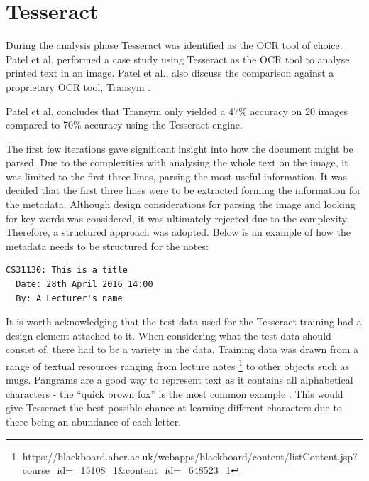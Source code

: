 \section{Tesseract} \label{design:tesseract}
During the analysis phase Tesseract was identified as the OCR tool of choice. Patel et al. \cite{citeulike:13920892} performed a case study using Tesseract as the OCR tool to analyse printed text in an image. Patel et al., also discuss the comparison against a proprietary OCR tool, Transym \cite{citeulike:14023819}.

Patel et al. concludes that Transym only yielded a 47\% accuracy on 20 images compared to 70\% accuracy using the Tesseract engine.

The first few iterations gave significant insight into how the document might be parsed. Due to the complexities with analysing the whole text on the image, it was limited to the first three lines, parsing the most useful information. It was decided that the first three lines were to be extracted forming the information for the metadata. Although design considerations for parsing the image and looking for key words was considered, it was ultimately rejected due to the complexity. Therefore, a structured approach was adopted. Below is an example of how the metadata needs to be structured for the notes:

\begin{lstlisting}[caption={An example exert from a valid structured note}, label={lst:mock1}, breaklines, columns=fullflexible, basicstyle=\normalsize\ttfamily]
  CS31130: This is a title
  Date: 28th April 2016 14:00
  By: A Lecturer's name
\end{lstlisting}



It is worth acknowledging that the test-data used for the Tesseract training had a design element attached to it. When considering what the test data should consist of, there had to be a variety in the data. Training data was drawn from a range of textual resources ranging from  lecture notes \footnote{\tiny https://blackboard.aber.ac.uk/webapps/blackboard/content/listContent.jsp?course\_id=\_15108\_1\&content\_id=\_648523\_1} to other objects such as mugs. Pangrams are a good way to represent text as it contains all alphabetical characters -  the ``quick brown fox'' is the most common example \cite{citeulike:14023830}. This would give Tesseract the best possible chance at learning different characters due to there being an abundance of each letter.

